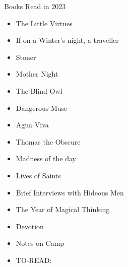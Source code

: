 Books Read in 2023
\begin{itemize}
    \item The Little Virtues
    \item If on a Winter's night, a traveller
    \item Stoner
    \item Mother Night
    \item The Blind Owl
    \item Dangerous Muse
    \item Agua Viva
    \item Thomas the Obscure
    \item Madness of the day
    \item Lives of Saints
    \item Brief Interviews with Hideous Men
    \item The Year of Magical Thinking
    \item Devotion
    \item Notes on Camp
    \item TO-READ: 
\end{itemize}